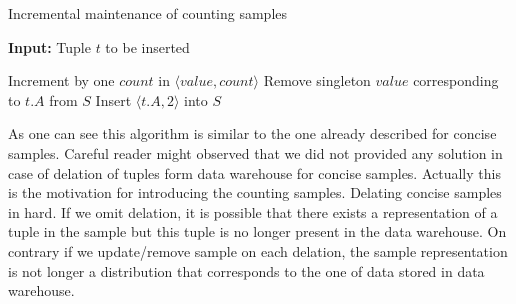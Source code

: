 \begin{algorithm}[H]
  \caption{Incremental maintenance of counting samples}
  \label{alg:maintenace-counting-algorithm}
  \textbf{Input:} Tuple $t$ to be inserted
  \begin{algorithmic}
  \State Increment by one $count$ in $\langle value, count \rangle$
  \State Remove singleton $value$ corresponding to $t.A$ from $S$
  \State Insert $\langle t.A, 2 \rangle$ into $S$
  \EndIf
  \EndIf
  \EndFunction
  \State{}
  \EndWhile
  \Else
  \EndIf
  \EndFor
  \EndFunction
\end{algorithmic}

\end{algorithm}
As one can see this algorithm is similar to the one already described
for concise samples. Careful reader might observed that we did not
provided any solution in case of delation of tuples form data
warehouse for concise samples. Actually this is the motivation for
introducing the counting samples. Delating concise samples in hard. If
we omit delation, it is possible that there exists a representation of
a tuple in the sample but this tuple is no longer present in the data
warehouse. On contrary if we update/remove sample on each delation,
the sample representation is not longer a distribution that
corresponds to the one of data stored in data warehouse. 